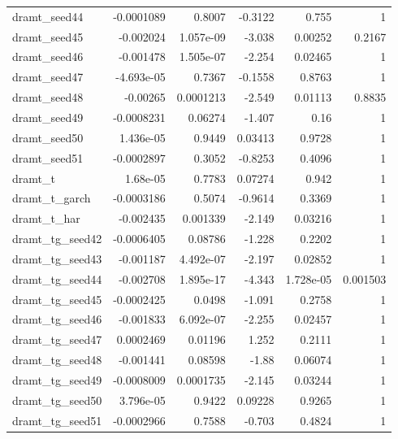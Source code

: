 \begin{table}
\begin{tabular}{lrrrrr}
dramt_seed44 & -0.0001089 & 0.8007 & -0.3122 & 0.755 & 1 \\
dramt_seed45 & -0.002024 & 1.057e-09 & -3.038 & 0.00252 & 0.2167 \\
dramt_seed46 & -0.001478 & 1.505e-07 & -2.254 & 0.02465 & 1 \\
dramt_seed47 & -4.693e-05 & 0.7367 & -0.1558 & 0.8763 & 1 \\
dramt_seed48 & -0.00265 & 0.0001213 & -2.549 & 0.01113 & 0.8835 \\
dramt_seed49 & -0.0008231 & 0.06274 & -1.407 & 0.16 & 1 \\
dramt_seed50 & 1.436e-05 & 0.9449 & 0.03413 & 0.9728 & 1 \\
dramt_seed51 & -0.0002897 & 0.3052 & -0.8253 & 0.4096 & 1 \\
dramt_t & 1.68e-05 & 0.7783 & 0.07274 & 0.942 & 1 \\
dramt_t_garch & -0.0003186 & 0.5074 & -0.9614 & 0.3369 & 1 \\
dramt_t_har & -0.002435 & 0.001339 & -2.149 & 0.03216 & 1 \\
dramt_tg_seed42 & -0.0006405 & 0.08786 & -1.228 & 0.2202 & 1 \\
dramt_tg_seed43 & -0.001187 & 4.492e-07 & -2.197 & 0.02852 & 1 \\
dramt_tg_seed44 & -0.002708 & 1.895e-17 & -4.343 & 1.728e-05 & 0.001503 \\
dramt_tg_seed45 & -0.0002425 & 0.0498 & -1.091 & 0.2758 & 1 \\
dramt_tg_seed46 & -0.001833 & 6.092e-07 & -2.255 & 0.02457 & 1 \\
dramt_tg_seed47 & 0.0002469 & 0.01196 & 1.252 & 0.2111 & 1 \\
dramt_tg_seed48 & -0.001441 & 0.08598 & -1.88 & 0.06074 & 1 \\
dramt_tg_seed49 & -0.0008009 & 0.0001735 & -2.145 & 0.03244 & 1 \\
dramt_tg_seed50 & 3.796e-05 & 0.9422 & 0.09228 & 0.9265 & 1 \\
dramt_tg_seed51 & -0.0002966 & 0.7588 & -0.703 & 0.4824 & 1 \\
\bottomrule
\end{tabular}
\end{table}
